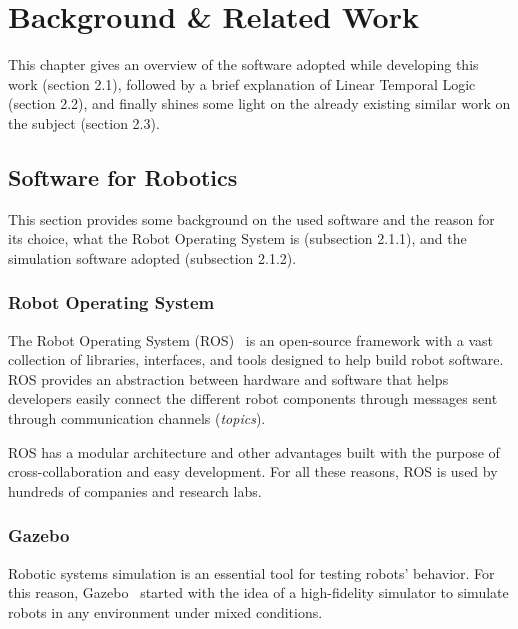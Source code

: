 \chapter{Background \& Related Work}
\label{chap:background}

This chapter gives an overview of the software adopted while developing this work (section 2.1), followed by a brief explanation of Linear Temporal Logic (section 2.2), and finally shines some light on the already existing similar work on the subject (section 2.3).

\section{Software for Robotics}

This section provides some background on the used software and the reason for its choice, what the Robot Operating System is (subsection 2.1.1), and the simulation software adopted (subsection 2.1.2).

\subsection{Robot Operating System}
\label{sec:ros}

The Robot Operating System (ROS)~\cite{quigley2009ros} is an open-source framework with a vast collection of libraries, interfaces, and tools designed to help build robot software. ROS provides an abstraction between hardware and software that helps developers easily connect the different robot components through messages sent through communication channels (\textit{topics}).

ROS has a modular architecture and other advantages built with the purpose of cross-collaboration and easy development. For all these reasons, ROS is used by hundreds of companies and research labs.


\subsection{Gazebo}
\label{sec:gazebo}

Robotic systems simulation is an essential tool for testing robots' behavior. For this reason, Gazebo~\cite{koenig2004design} started with the idea of a high-fidelity simulator to simulate robots in any environment under mixed conditions.

